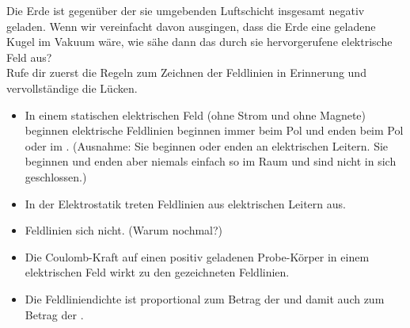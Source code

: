 \documentclass[task=1]{exercise}
\begin{document}
  \task[Feldlinienbild]
  Die Erde ist gegenüber der sie umgebenden Luftschicht insgesamt negativ geladen.
  Wenn wir vereinfacht davon ausgingen, dass die Erde eine geladene Kugel im Vakuum wäre,
  wie sähe dann das durch sie hervorgerufene elektrische Feld aus?\\
  Rufe dir zuerst die Regeln zum Zeichnen der Feldlinien in Erinnerung und vervollständige die Lücken.\\
  \begin{itemize}
   \item In einem statischen elektrischen Feld (ohne Strom und ohne Magnete) beginnen elektrische Feldlinien beginnen immer beim \luecke{3cm} Pol und enden beim \luecke{3cm} Pol oder im \luecke{3cm}. (Ausnahme: Sie beginnen oder enden an elektrischen Leitern. Sie beginnen und enden aber niemals einfach so im Raum und sind nicht in sich geschlossen.)
   \item In der Elektrostatik treten Feldlinien \luecke{3cm} aus elektrischen Leitern aus.
   \item Feldlinien \luecke{3cm} sich nicht. (Warum nochmal?)
   \item Die Coulomb-Kraft auf einen positiv geladenen Probe-Körper in einem elektrischen Feld wirkt \luecke{3cm} zu den gezeichneten Feldlinien.
   \item Die Feldliniendichte ist proportional zum Betrag der \luecke{3cm} und damit auch zum Betrag der \luecke{5cm}.
  \end{itemize}
\end{document}
